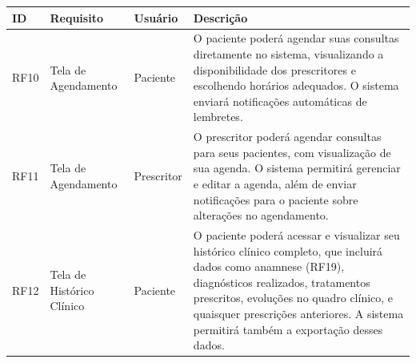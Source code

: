\href{}{}\documentclass[12pt,portuguese,oneside]{article}
\begin{document}
\newpage

\begin{table}[H]
\centering
{}
\begin{tabularx}{\textwidth}{|>{\raggedright\arraybackslash}p{1cm}|>{\raggedright\arraybackslash}p{3cm}|>{\raggedright\arraybackslash}p{2cm}|>{\raggedright\arraybackslash}X|}
\hline
\rowcolor{gray!20}
\textbf{ID} & \textbf{Requisito} & \textbf{Usuário} & \textbf{Descrição}\\
\hline
RF10 & Tela de Agendamento & Paciente & O paciente poderá agendar suas consultas diretamente no sistema, visualizando a disponibilidade dos prescritores e escolhendo horários adequados. O sistema enviará notificações automáticas de lembretes.\\
\hline
RF11 & Tela de Agendamento & Prescritor & O prescritor poderá agendar consultas para seus pacientes, com visualização de sua agenda. O sistema permitirá gerenciar e editar a agenda, além de enviar notificações para o paciente sobre alterações no agendamento.\\
\hline
RF12 & Tela de Histórico Clínico & Paciente & O paciente poderá acessar e visualizar seu histórico clínico completo, que incluirá dados como anamnese (RF19), diagnósticos realizados, tratamentos prescritos, evoluções no quadro clínico, e quaisquer prescrições anteriores. A sistema permitirá também a exportação desses dados.\\
\hline
\end{tabularx}
\end{table}

\newpage
\end{document}
